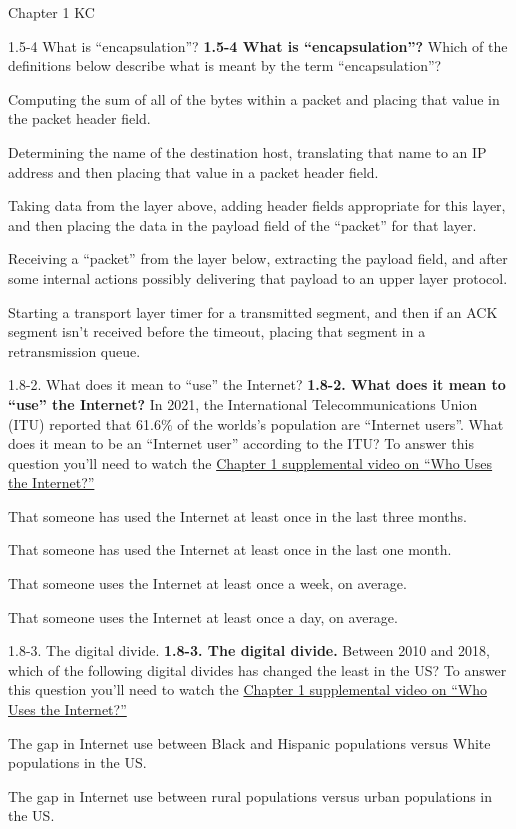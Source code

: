 \documentclass[a4paper]{article}
\begin{document}
\begin{quiz}{Chapter 1 KC}
\begin{multi}[points=1]{1.5-4 What is ``encapsulation''?}
\textbf{1.5-4 What is ``encapsulation''?} 
Which of the definitions below describe what is meant by the term ``encapsulation''?
\item Computing the sum of all of the bytes within a packet and placing that value in the packet header field.
\item Determining the name of the destination host, translating that name to an IP address and then placing that value in a packet header field.
\item* Taking data from the layer above, adding header fields appropriate for this layer, and then placing the data in the payload field of the ``packet'' for that layer.
\item Receiving a ``packet'' from the layer below, extracting the payload field, and after some internal actions possibly delivering that payload to an upper layer protocol.
\item Starting a transport layer timer for a transmitted segment, and then if an ACK segment isn't received before the timeout, placing that segment in a retransmission queue.
\end{multi}

\begin{multi}[points=1]{1.8-2. What does it mean to ``use'' the Internet?}
\textbf{1.8-2. What does it mean to ``use'' the Internet?} 
In 2021, the International Telecommunications Union (ITU) reported that 61.6\% of the worlds's population are ``Internet users''.  What does it mean to be an ``Internet user'' according to the ITU? 
To answer this question you'll need to watch the \href{https://www.youtube.com/watch?v=-YaGGf8C1A4}{Chapter 1 supplemental video on ``Who Uses the Internet?''}
\item* That someone has used the Internet at least once in the last three months.
\item That someone has used the Internet at least once in the last one month.
\item That someone uses the Internet at least once a week, on average.
\item That someone uses the Internet at least once a day, on average.
\end{multi}

\begin{multi}[points=1]{1.8-3. The digital divide.}
\textbf{1.8-3.  The digital divide.} 
Between 2010 and 2018, which of the following digital divides has changed the least in the US? 
To answer this question you'll need to watch the \href{https://www.youtube.com/watch?v=-YaGGf8C1A4}{Chapter 1 supplemental video on ``Who Uses the Internet?''}
\item* The gap in Internet use between Black and Hispanic populations versus White populations in the US.
\item The gap in Internet use between rural populations versus urban populations in the US.
\end{multi}


\end{quiz}
\end{document}
